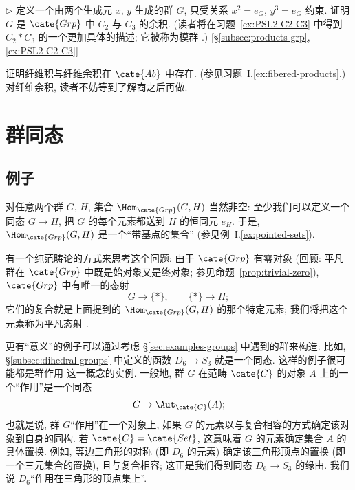 \begin{prob}
\label{ex:c2-c3-coproduct}
$\triangleright$ 定义一个由两个生成元 $x$, $y$ 生成的群 $G$, 只受关系 $x^2 = e_G$, $y^3 = e_G$ 约束. 证明 $G$ 是 $\cate{Grp}$ 中 $C_2$ 与 $C_3$ 的余积. (读者将在习题~\ref{ex:PSL2-C2-C3} 中得到 $C_2 * C_3$ 的一个更加具体的描述; 它被称为模群%
.) [\S\ref{subsec:products-grp}, \ref{ex:PSL2-C2-C3}]
\end{prob}

\begin{prob}
\label{ex:fibered-Ab}
证明纤维积与纤维余积在 $\cate{Ab}$ 中存在. (参见习题~I.\ref{ex:fibered-products}.) 对纤维余积, 读者不妨等到了解商之后再做.
\end{prob}

\section{群同态}
\label{sec:group-homomorphisms}

\subsection{例子}
\label{subsec:hom-examples}

对任意两个群 $G$, $H$, 集合 $\Hom_{\cate{Grp}}(G, H)$ 当然非空: 至少我们可以定义一个同态 $G \to H$, 把 $G$ 的每个元素都送到 $H$ 的恒同元 $e_H$. 于是, $\Hom_{\cate{Grp}}(G, H)$ 是一个``带基点的集合'' (参见例~I.\ref{ex:pointed-sets}).

有一个纯范畴论的方式来思考这个问题: 由于 $\cate{Grp}$ 有零对象 (回顾: 平凡群在 $\cate{Grp}$ 中既是始对象又是终对象; 参见命题~\ref{prop:trivial-zero}), $\cate{Grp}$ 中有唯一的态射
\[
G \rightarrow \{*\}, \qquad \{*\} \rightarrow H;
\]
它们的复合就是上面提到的 $\Hom_{\cate{Grp}}(G, H)$ 的那个特定元素; 我们将把这个元素称为平凡态射%
.

更有``意义''的例子可以通过考虑 \S\ref{sec:examples-groups} 中遇到的群来构造: 比如, \S\ref{subsec:dihedral-groups} 中定义的函数 $D_6 \to S_3$ 就是一个同态. 这样的例子很可能都是群作用%
这一概念的实例. 一般地, 群 $G$ 在范畴 $\cate{C}$ 的对象 $A$ 上的一个``作用''是一个同态
\[
G \to \Aut_{\cate{C}}(A);
\]
也就是说, 群 $G$``作用''在一个对象上, 如果 $G$ 的元素以与复合相容的方式确定该对象到自身的同构. 若 $\cate{C} = \cate{Set}$, 这意味着 $G$ 的元素确定集合 $A$ 的具体置换. 例如, 等边三角形的对称 (即 $D_6$ 的元素) 确定该三角形顶点的置换 (即一个三元集合的置换), 且与复合相容; 这正是我们得到同态 $D_6 \to S_3$ 的缘由. 我们说 $D_6$``作用在三角形的顶点集上''.

